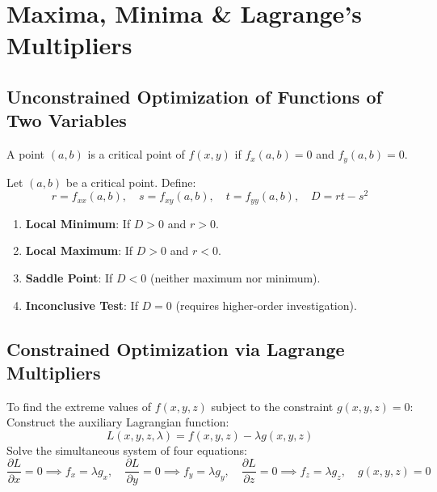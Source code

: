 \section{Maxima, Minima \& Lagrange's Multipliers}

\subsection{Unconstrained Optimization of Functions of Two Variables}

\begin{definition}
A point $(a,b)$ is a critical point of $f(x,y)$ if $f_x(a,b) = 0$ and $f_y(a,b) = 0$.
\end{definition}

\begin{theorem}
Let $(a,b)$ be a critical point. Define:
\begin{equation}
    r = f_{xx}(a,b), \quad s = f_{xy}(a,b), \quad t = f_{yy}(a,b), \quad D = rt - s^2
\end{equation}
\begin{enumerate}[leftmargin=1.5em]
    \item \textbf{Local Minimum}: If $D > 0$ and $r > 0$.
    \item \textbf{Local Maximum}: If $D > 0$ and $r < 0$.
    \item \textbf{Saddle Point}: If $D < 0$ (neither maximum nor minimum).
    \item \textbf{Inconclusive Test}: If $D = 0$ (requires higher-order investigation).
\end{enumerate}
\end{theorem}

\subsection{Constrained Optimization via Lagrange Multipliers}

\begin{theorem}
To find the extreme values of $f(x,y,z)$ subject to the constraint $g(x,y,z) = 0$:
Construct the auxiliary Lagrangian function:
\begin{equation}
    L(x,y,z,\lambda) = f(x,y,z) - \lambda g(x,y,z)
\end{equation}
Solve the simultaneous system of four equations:
\begin{equation}
    \frac{\partial L}{\partial x} = 0 \implies f_x = \lambda g_x, \quad \frac{\partial L}{\partial y} = 0 \implies f_y = \lambda g_y, \quad \frac{\partial L}{\partial z} = 0 \implies f_z = \lambda g_z, \quad g(x,y,z) = 0
\end{equation}
\end{theorem}

